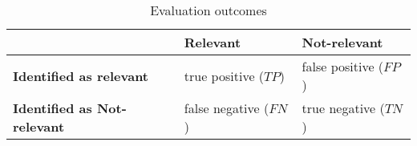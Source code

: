 \begin{table}[H]
\centering    
\begin{scriptsize}
\begin{threeparttable}
\begin{tabular}{l|l|l}

\hline

\textbf{}
& \textbf{Relevant}    
& \textbf{Not-relevant} \\

\hline
\hline

\textbf{Identified as relevant} & true positive ($TP$) & false positive ($FP$) \\
\hline
\textbf{Identified as Not-relevant} & false negative ($FN$) & true negative ($TN$) \\
\hline

\end{tabular}
\end{threeparttable}
\end{scriptsize}
\caption{Evaluation outcomes}
\label{tbl:type-I-II-errors}
\end{table}

    